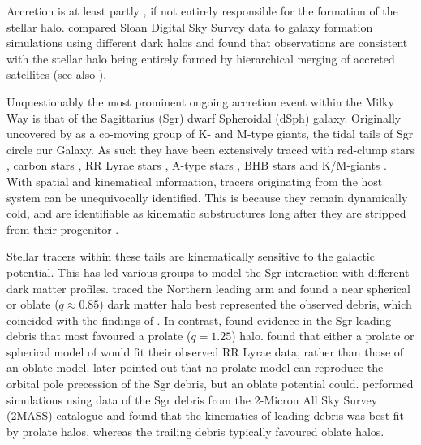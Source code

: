 \documentclass[preprint2]{aastex}
\begin{document}
 Accretion is at least partly \citep[e.g.,][]{Starkenburg;et-al_2009}, if not entirely responsible for the formation of the stellar halo. \citet{Bell;et-al_2008} compared Sloan Digital Sky Survey \citep[hereafter SDSS]{York;et-al_2000} data to galaxy formation simulations using different dark halos and found that observations are consistent with the stellar halo being entirely formed by hierarchical merging of accreted satellites (see also \citet{Xue;et-al_2011}).
	
Unquestionably the most prominent ongoing accretion event within the Milky Way is that of the Sagittarius (Sgr) dwarf Spheroidal (dSph) galaxy. Originally uncovered by \citet{Ibata;et-al_1994} as a co-moving group of K- and M-type giants, the tidal tails of Sgr circle our Galaxy. As such they have been extensively traced with red-clump stars \citep{Majewski;et-al_1999}, carbon stars \citep{Totten;Irwin_1998, Ibata;et-al_2001}, RR Lyrae stars \citep{Ivezic;et-al_2000, Vivas;et-al_2005, Keller;et-al_2008, Watkins;et-al_2009, Prior;et-al_2009b}, A-type stars \citep{Newberg;et-al_2003}, BHB stars \citep{Ruhland;et-al_2011} and K/M-giants \citep{Majewski;et-al_2003,  Yanny;et-al_2009, Keller;Yong;Da_Costa_2010}. With spatial and kinematical information, tracers originating from the host system can be unequivocally identified. This is because they remain dynamically cold, and are identifiable as kinematic substructures long after they are stripped from their progenitor \citep[for example][]{Ibata;Lewis_1998, Helmi;White_1999}. 
	
Stellar tracers within these tails are kinematically sensitive to the galactic potential. This has led various groups to model the Sgr interaction with different dark matter profiles. \citet{Martinez-Delgado;et-al_2004} traced the Northern leading arm and found a near spherical or oblate ($q \approx 0.85$) dark matter halo best represented the observed debris, which coincided with the findings of \citet{Ibata;et-al_2001}. In contrast, \citet{Helmi_2004} found evidence in the Sgr leading debris that most favoured a prolate ($q = 1.25$) halo. \citet{Vivas;et-al_2005} found that either a prolate or spherical model of  \citet{Helmi_2004} would fit their observed RR Lyrae data, rather than those of an oblate model. \citet{Johnston;et-al_2005} later pointed out that no prolate model can reproduce the orbital pole precession of the Sgr debris, but an oblate potential could. \citet[hereafter LJM05]{Law;et-al_2005} performed simulations using data of the Sgr debris from the 2-Micron All Sky Survey (2MASS) catalogue and found that the kinematics of leading debris was best fit by prolate halos, whereas the trailing debris typically favoured oblate halos. 
	
\end{document}
